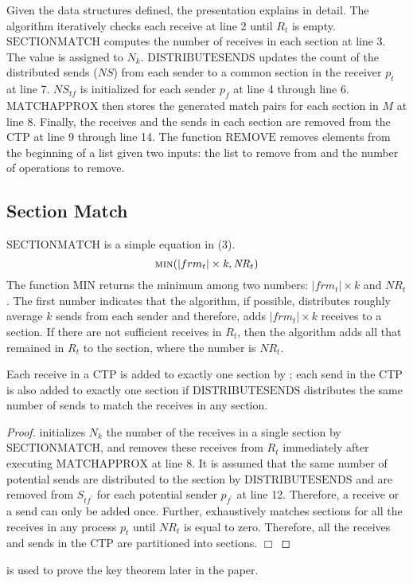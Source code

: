 Given the data structures defined, the presentation explains  in detail.
The algorithm iteratively checks each receive at line 2 until $R_t$ is empty.  
$\mathrm{SECTIONMATCH}$ computes the number of receives in each section at line 3. The value is assigned to $N_k$. 
$\mathrm{DISTRIBUTESENDS}$ updates the count of the distributed sends ($\mathit{NS}$) from each sender to a common section in the receiver $p_t$ at line 7. 
$\mathit{NS_{tf}}$ is initialized for each sender $p_f$ at line 4 through line 6.
$\mathrm{MATCHAPPROX}$ then stores the generated match pairs for each section in $M$ at line 8. 
Finally, the receives and the sends in each section are removed from the CTP at line 9 through line 14. 
The function $\mathrm{REMOVE}$ removes elements from the beginning of a list given two inputs: the list to remove from and the number of operations to remove. 

\subsection{Section Match}

$\mathrm{SECTIONMATCH}$ is a simple equation in (3).
\begin{equation}
\Call{min}{|frm_t|\times\mathit{k}, \mathit{NR}_{t}}
\end{equation}
The function $\mathrm{MIN}$ returns the minimum among two numbers: $|frm_t|\times\mathit{k}$ and $\mathit{NR}_{t}$.
The first number indicates that the algorithm, if possible, distributes roughly average $k$  sends from each sender and therefore, adds $|frm_t|\times\mathit{k}$ receives to a section. If there are not sufficient receives in $R_t$, then the algorithm adds all that remained in $R_t$ to the section, where the number is $\mathit{NR}_{t}$.


\begin{lemma}
\label{lemma:section}
Each receive in a CTP is added to exactly one section by ; each send in the CTP is also added to exactly one section if $\mathrm{DISTRIBUTESENDS}$ distributes the same number of sends to match the receives in any section.
\end{lemma}
\begin{proof}
 initializes $N_k$ the number of the receives in a single section by $\mathrm{SECTIONMATCH}$, and removes these receives from $R_t$ immediately after executing $\mathrm{MATCHAPPROX}$ at line 8. It is assumed that the same number of potential sends are distributed to the section by $\mathrm{DISTRIBUTESENDS}$ and are removed from $S_{tf^\prime}$ for each potential sender $p_{f^\prime}$ at line 12. Therefore, a receive or a send can only be added once. 
Further,  exhaustively matches sections for all the receives in any process $p_t$ until $\mathit{NR}_{t}$ is equal to zero. 
Therefore, all the receives and sends in the CTP are partitioned into sections. 
$\Box$
\end{proof}
 is used to prove the key theorem later in the paper.



